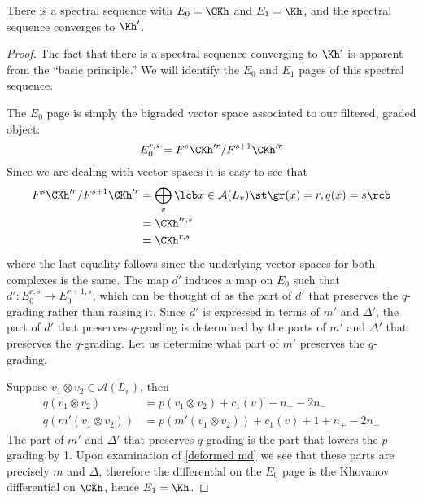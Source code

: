 \begin{thm}
\label{Lee's spectral sequence}
There is a spectral sequence with $E_0 = \CKh$ and $E_1 = \Kh$, and the spectral sequence converges to $\Kh'$.
\end{thm}
\begin{proof}
The fact that there is a spectral sequence converging to $\Kh'$ is apparent from the ``basic principle.'' We will identify the $E_0$ and $E_1$ pages of this spectral sequence. 

The $E_0$ page is simply the bigraded vector space associated to our filtered, graded object:
\begin{equation}
\label{associated bigraded vector space}
E_0^{r,s} = F^s \CKh'^r / F^{s+1} \CKh'^r
\end{equation}
Since we are dealing with vector spaces it is easy to see that
\begin{align*}
	F^s \CKh'^r / F^{s+1} \CKh'^r &= \bigoplus_v \lcb x \in \mathcal A(L_v) \st \gr(x)=r, q(x) = s \rcb \\
	                              &= \CKh'^{r,s} \\
	                              &= \CKh^{r,s}
\end{align*}
where the last equality follows since the underlying vector spaces for both complexes is the same. The map $d'$ induces a map on $E_0$ such that $d' : E_0^{r,s} \rightarrow E_0^{r+1,s}$, which can be thought of as the part of $d'$ that preserves the $q$-grading rather than raising it. Since $d'$ is expressed in terms of $m'$ and $\Delta'$, the part of $d'$ that preserves $q$-grading is determined by the parts of $m'$ and $\Delta'$ that preserves the $q$-grading. Let us determine what part of $m'$ preserves the $q$-grading. 


Suppose $v_1 \otimes v_2 \in \mathcal A(L_v)$, then 
\begin{align*}
q(v_1 \otimes v_2) &= p(v_1 \otimes v_2) + c_1(v) + n_+ - 2n_- \\
q(m'(v_1 \otimes v_2)) &= p(m'(v_1 \otimes v_2)) + c_1(v) + 1 + n_+ - 2n_- 
\end{align*}
The part of $m'$ and $\Delta'$ that preserves $q$-grading is the part that lowers the $p$-grading by 1. Upon examination of \eqref{deformed md} we see that these parts are precisely $m$ and $\Delta$, therefore the differential on the $E_0$ page is the Khovanov differential on $\CKh$, hence $E_1 = \Kh$.
\end{proof}


